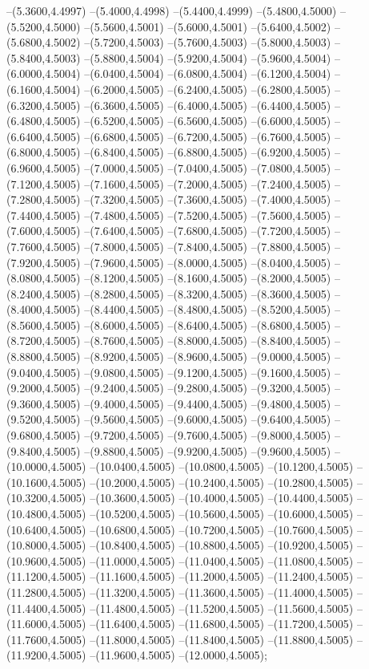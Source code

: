 {	--(5.3600,4.4997)
	--(5.4000,4.4998)
	--(5.4400,4.4999)
	--(5.4800,4.5000)
	--(5.5200,4.5000)
	--(5.5600,4.5001)
	--(5.6000,4.5001)
	--(5.6400,4.5002)
	--(5.6800,4.5002)
	--(5.7200,4.5003)
	--(5.7600,4.5003)
	--(5.8000,4.5003)
	--(5.8400,4.5003)
	--(5.8800,4.5004)
	--(5.9200,4.5004)
	--(5.9600,4.5004)
	--(6.0000,4.5004)
	--(6.0400,4.5004)
	--(6.0800,4.5004)
	--(6.1200,4.5004)
	--(6.1600,4.5004)
	--(6.2000,4.5005)
	--(6.2400,4.5005)
	--(6.2800,4.5005)
	--(6.3200,4.5005)
	--(6.3600,4.5005)
	--(6.4000,4.5005)
	--(6.4400,4.5005)
	--(6.4800,4.5005)
	--(6.5200,4.5005)
	--(6.5600,4.5005)
	--(6.6000,4.5005)
	--(6.6400,4.5005)
	--(6.6800,4.5005)
	--(6.7200,4.5005)
	--(6.7600,4.5005)
	--(6.8000,4.5005)
	--(6.8400,4.5005)
	--(6.8800,4.5005)
	--(6.9200,4.5005)
	--(6.9600,4.5005)
	--(7.0000,4.5005)
	--(7.0400,4.5005)
	--(7.0800,4.5005)
	--(7.1200,4.5005)
	--(7.1600,4.5005)
	--(7.2000,4.5005)
	--(7.2400,4.5005)
	--(7.2800,4.5005)
	--(7.3200,4.5005)
	--(7.3600,4.5005)
	--(7.4000,4.5005)
	--(7.4400,4.5005)
	--(7.4800,4.5005)
	--(7.5200,4.5005)
	--(7.5600,4.5005)
	--(7.6000,4.5005)
	--(7.6400,4.5005)
	--(7.6800,4.5005)
	--(7.7200,4.5005)
	--(7.7600,4.5005)
	--(7.8000,4.5005)
	--(7.8400,4.5005)
	--(7.8800,4.5005)
	--(7.9200,4.5005)
	--(7.9600,4.5005)
	--(8.0000,4.5005)
	--(8.0400,4.5005)
	--(8.0800,4.5005)
	--(8.1200,4.5005)
	--(8.1600,4.5005)
	--(8.2000,4.5005)
	--(8.2400,4.5005)
	--(8.2800,4.5005)
	--(8.3200,4.5005)
	--(8.3600,4.5005)
	--(8.4000,4.5005)
	--(8.4400,4.5005)
	--(8.4800,4.5005)
	--(8.5200,4.5005)
	--(8.5600,4.5005)
	--(8.6000,4.5005)
	--(8.6400,4.5005)
	--(8.6800,4.5005)
	--(8.7200,4.5005)
	--(8.7600,4.5005)
	--(8.8000,4.5005)
	--(8.8400,4.5005)
	--(8.8800,4.5005)
	--(8.9200,4.5005)
	--(8.9600,4.5005)
	--(9.0000,4.5005)
	--(9.0400,4.5005)
	--(9.0800,4.5005)
	--(9.1200,4.5005)
	--(9.1600,4.5005)
	--(9.2000,4.5005)
	--(9.2400,4.5005)
	--(9.2800,4.5005)
	--(9.3200,4.5005)
	--(9.3600,4.5005)
	--(9.4000,4.5005)
	--(9.4400,4.5005)
	--(9.4800,4.5005)
	--(9.5200,4.5005)
	--(9.5600,4.5005)
	--(9.6000,4.5005)
	--(9.6400,4.5005)
	--(9.6800,4.5005)
	--(9.7200,4.5005)
	--(9.7600,4.5005)
	--(9.8000,4.5005)
	--(9.8400,4.5005)
	--(9.8800,4.5005)
	--(9.9200,4.5005)
	--(9.9600,4.5005)
	--(10.0000,4.5005)
	--(10.0400,4.5005)
	--(10.0800,4.5005)
	--(10.1200,4.5005)
	--(10.1600,4.5005)
	--(10.2000,4.5005)
	--(10.2400,4.5005)
	--(10.2800,4.5005)
	--(10.3200,4.5005)
	--(10.3600,4.5005)
	--(10.4000,4.5005)
	--(10.4400,4.5005)
	--(10.4800,4.5005)
	--(10.5200,4.5005)
	--(10.5600,4.5005)
	--(10.6000,4.5005)
	--(10.6400,4.5005)
	--(10.6800,4.5005)
	--(10.7200,4.5005)
	--(10.7600,4.5005)
	--(10.8000,4.5005)
	--(10.8400,4.5005)
	--(10.8800,4.5005)
	--(10.9200,4.5005)
	--(10.9600,4.5005)
	--(11.0000,4.5005)
	--(11.0400,4.5005)
	--(11.0800,4.5005)
	--(11.1200,4.5005)
	--(11.1600,4.5005)
	--(11.2000,4.5005)
	--(11.2400,4.5005)
	--(11.2800,4.5005)
	--(11.3200,4.5005)
	--(11.3600,4.5005)
	--(11.4000,4.5005)
	--(11.4400,4.5005)
	--(11.4800,4.5005)
	--(11.5200,4.5005)
	--(11.5600,4.5005)
	--(11.6000,4.5005)
	--(11.6400,4.5005)
	--(11.6800,4.5005)
	--(11.7200,4.5005)
	--(11.7600,4.5005)
	--(11.8000,4.5005)
	--(11.8400,4.5005)
	--(11.8800,4.5005)
	--(11.9200,4.5005)
	--(11.9600,4.5005)
	--(12.0000,4.5005);
}

